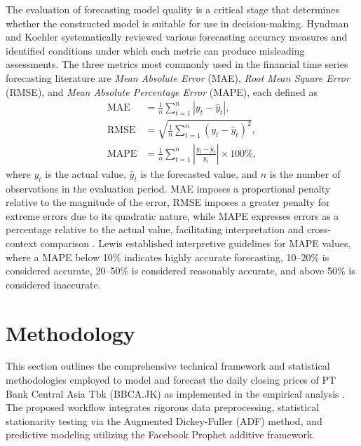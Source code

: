 \documentclass[11pt,twoside]{article}
\begin{document}
The evaluation of forecasting model quality is a critical stage that determines whether the constructed model is suitable for use in decision-making. Hyndman and Koehler \cite{Hyndman2006} systematically reviewed various forecasting accuracy measures and identified conditions under which each metric can produce misleading assessments. The three metrics most commonly used in the financial time series forecasting literature are \textit{Mean Absolute Error} (MAE), \textit{Root Mean Square Error} (RMSE), and \textit{Mean Absolute Percentage Error} (MAPE), each defined as
\begin{align}
    \text{MAE}  &= \frac{1}{n}\sum_{t=1}^{n} |y_t - \hat{y}_t|, \label{Eq:MAE} \\[4pt]
    \text{RMSE} &= \sqrt{\frac{1}{n}\sum_{t=1}^{n}(y_t - \hat{y}_t)^2}, \label{Eq:RMSE} \\[4pt]
    \text{MAPE} &= \frac{1}{n}\sum_{t=1}^{n}\left|\frac{y_t - \hat{y}_t}{y_t}\right|\times 100\%, \label{Eq:MAPE}
\end{align}
where $y_t$ is the actual value, $\hat{y}_t$ is the forecasted value, and $n$ is the number of observations in the evaluation period. MAE imposes a proportional penalty relative to the magnitude of the error, RMSE imposes a greater penalty for extreme errors due to its quadratic nature, while MAPE expresses errors as a percentage relative to the actual value, facilitating interpretation and cross-context comparison \cite{Hyndman2006}. Lewis \cite{Lewis1982} established interpretive guidelines for MAPE values, where a MAPE below 10\% indicates highly accurate forecasting, 10--20\% is considered accurate, 20--50\% is considered reasonably accurate, and above 50\% is considered inaccurate.
\section{Methodology}
\label{Sec:Method}

This section outlines the comprehensive technical framework and statistical methodologies employed to model and forecast the daily closing prices of PT Bank Central Asia Tbk (BBCA.JK) as implemented in the empirical analysis \cite{Taylor2018}. The proposed workflow integrates rigorous data preprocessing, statistical stationarity testing via the Augmented Dickey-Fuller (ADF) method, and predictive modeling utilizing the Facebook Prophet additive framework.
\end{document}
